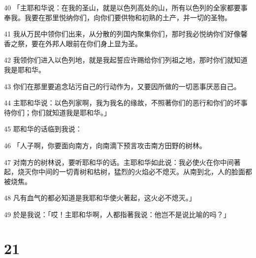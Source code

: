 \par 40 「主耶和华说：在我的圣山，就是以色列高处的山，所有以色列的全家都要事奉我。我要在那里悦纳你们，向你们要供物和初熟的土产，并一切的圣物。
\par 41 我从万民中领你们出来，从分散的列国内聚集你们，那时我必悦纳你们好像馨香之祭，要在外邦人眼前在你们身上显为圣。
\par 42 我领你们进入以色列地，就是我起誓应许赐给你们列祖之地，那时你们就知道我是耶和华。
\par 43 你们在那里要追念玷污自己的行动作为，又要因所做的一切恶事厌恶自己。
\par 44 主耶和华说：以色列家啊，我为我名的缘故，不照著你们的恶行和你们的坏事待你们；你们就知道我是耶和华。」
\par 45 耶和华的话临到我说：
\par 46 「人子啊，你要面向南方，向南滴下预言攻击南方田野的树林。
\par 47 对南方的树林说，要听耶和华的话。主耶和华如此说：我必使火在你中间著起，烧灭你中间的一切青树和枯树，猛烈的火焰必不熄灭。从南到北，人的脸面都被烧焦。
\par 48 凡有血气的都必知道是我耶和华使火著起，这火必不熄灭。」
\par 49 於是我说：「哎！主耶和华啊，人都指著我说：他岂不是说比喻的吗？」

\chapter{21}

